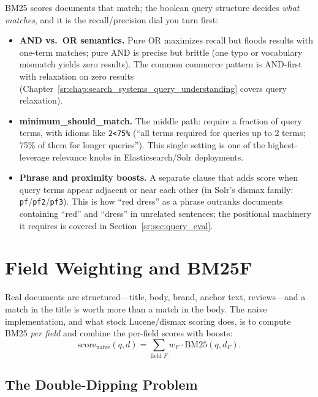 BM25 scores documents that match; the boolean query structure decides \emph{what matches}, and it is the recall/precision dial you turn first:

\begin{itemize}
    \item \textbf{AND vs.\ OR semantics.} Pure OR maximizes recall but floods results with one-term matches; pure AND is precise but brittle (one typo or vocabulary mismatch yields zero results). The common commerce pattern is AND-first with relaxation on zero results (Chapter~\ref{sr:chap:search_systems_query_understanding} covers query relaxation).
    \item \textbf{minimum\_should\_match.} The middle path: require a fraction of query terms, with idioms like \texttt{2<75\%} (``all terms required for queries up to 2 terms; 75\% of them for longer queries''). This single setting is one of the highest-leverage relevance knobs in Elasticsearch/Solr deployments.
    \item \textbf{Phrase and proximity boosts.} A separate clause that adds score when query terms appear adjacent or near each other (in Solr's dismax family: \texttt{pf}/\texttt{pf2}/\texttt{pf3}). This is how ``red dress'' as a phrase outranks documents containing ``red'' and ``dress'' in unrelated sentences; the positional machinery it requires is covered in Section~\ref{sr:sec:query_eval}.
\end{itemize}

\section{Field Weighting and BM25F}
\label{sr:sec:bm25f}

Real documents are structured---title, body, brand, anchor text, reviews---and a match in the title is worth more than a match in the body. The naive implementation, and what stock Lucene/dismax scoring does, is to compute BM25 \emph{per field} and combine the per-field scores with boosts:
\begin{equation}
\text{score}_{\text{naive}}(q,d) = \sum_{\text{field } F} w_F \cdot \text{BM25}(q, d_F).
\label{sr:eq:perfield_sum}
\end{equation}

\subsection{The Double-Dipping Problem}

